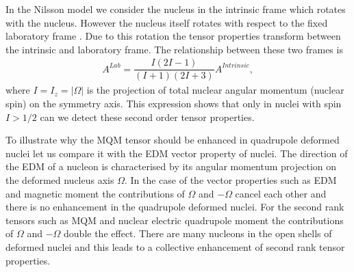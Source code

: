 \documentclass[10pt,a4paper, twoside]{report}
\begin{document}
In the Nilsson model we consider the nucleus in the intrinsic frame which rotates with the nucleus. However the nucleus itself rotates with respect to the fixed laboratory frame \cite{BohrMottVol2}. Due to this rotation the tensor properties transform between the intrinsic  and laboratory frame. The relationship between these two frames is \cite{BohrMottVol2}
\begin{align} \label{eq:RotationalFactor}
A^{Lab} = \dfrac{I\left(2I - 1\right)}{\left(I + 1 \right)\left(2I + 3\right)}A^{Intrinsic},
\end{align}
where $I=I_z= \left|\Omega\right|$ is the projection of total nuclear angular momentum (nuclear spin) on the symmetry axis. This expression shows that only in nuclei with spin $I > 1/2$ can we detect these second order tensor properties. 

To illustrate why the MQM tensor should be enhanced in quadrupole deformed nuclei let us compare it with  the EDM vector property of nuclei. The direction of the EDM of a nucleon is characterised by its angular momentum projection on the deformed nucleus axis $\Omega$. In the case of the vector properties such as EDM and magnetic moment the contributions of $\Omega$ and $-\Omega$ cancel each other and  there is no enhancement in the quadrupole deformed nuclei. For the second rank tensors such as MQM and nuclear electric quadrupole moment the contributions of $\Omega$ and $-\Omega$ double the effect. There are many nucleons in the open shells of deformed nuclei and this leads to a collective enhancement of second rank tensor properties.
\end{document}
